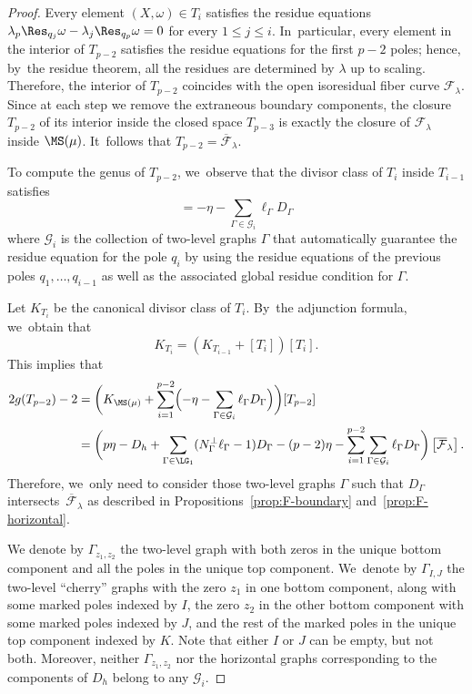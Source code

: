 \begin{proof}
Every element $(X,\omega)\in T_i$ satisfies the residue equations $\lambda_{p} \Res_{q_j}\omega-\lambda_{j} \Res_{q_p}\omega=0$ for every $1\leq j \leq i$. In~particular, every element in the interior of $T_{p-2}$ satisfies the residue equations for the first $p-2$ poles; hence, by~the residue theorem, all the residues are determined by $\lambda$ up to scaling. Therefore, the interior of $T_{p-2}$ coincides with the open isoresidual fiber curve $\mathcal{F}_\lambda$. Since at each step we remove the extraneous boundary components, the closure $T_{p-2}$ of its interior inside the closed space $T_{p-3}$ is exactly the closure of $\mathcal{F}_\lambda$ inside $\MS(\mu)$. It~follows that $T_{p-2}=\overline{\mathcal F}_\lambda$.

To compute the genus of $T_{p-2}$, we~observe that the divisor class of $T_i$ inside $T_{i-1}$ satisfies
\begin{equation*}
[T_i]=-\eta-\sum_{\Gamma\in \mathcal{G}_i}\ell_{\Gamma}D_{\Gamma}
\end{equation*}
where $\mathcal{G}_i$ is the collection of two-level graphs $\Gamma$ that automatically guarantee the residue equation for the pole $q_i$ by using the residue equations of the previous poles $q_1,\ldots, q_{i-1}$ as well as the associated global residue condition for $\Gamma$.

Let $K_{T_{i}}$ be the canonical divisor class of $T_i$. By~the adjunction formula, we~obtain that
\begin{equation*}
K_{T_i} = \left(K_{T_{i-1}} + [T_i]\right)[T_i].
\end{equation*}
This implies that
\begin{align*}
2g (T_{p-2})-2 & = \biggl(K_{\MS(\mu)} + \sum_{i=1}^{p-2}\Bigl( -\eta-\sum_{\Gamma\in \mathcal{G}_i}\ell_{\Gamma}D_{\Gamma} \Bigr)\biggr)[T_{p-2}] \\
& = \biggl( p\eta -D_h + \sum_{\Gamma \in \LG_1}(N_{\Gamma}^\bot\ell_{\Gamma}-1)D_{\Gamma} - (p-2)\eta - \sum_{i=1}^{p-2}\sum_{\Gamma \in \mathcal{G}_i}\ell_{\Gamma} D_{\Gamma} \biggr)\left[\overline{\mathcal F}_\lambda\right].
\end{align*}
Therefore, we~only need to consider those two-level graphs $\Gamma$ such that $D_{\Gamma}$ intersects~$\overline{\mathcal F}_\lambda$ as described in Propositions~\ref{prop:F-boundary} and~\ref{prop:F-horizontal}.

We denote by $\Gamma_{z_1,z_2}$ the two-level graph with both zeros in the unique bottom component and all the poles in the unique top component. We~denote by $\Gamma_{I,J}$ the two-level ``cherry'' graphs with the zero $z_1$ in one bottom component, along with some marked poles indexed by $I$, the zero $z_2$ in the other bottom component with some marked poles indexed by $J$, and the rest of the marked poles in the unique top component indexed by $K$. Note that either $I$ or $J$ can be empty, but not both. Moreover, neither $\Gamma_{z_1,z_2}$ nor the horizontal graphs corresponding to the components of $D_h$ belong to any $\mathcal{G}_i$.


\end{proof}
